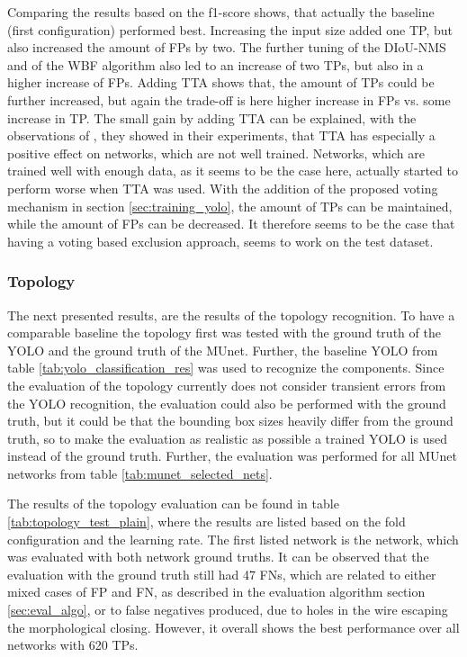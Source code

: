 Comparing the results based on the f1-score shows, that actually the baseline (first configuration) performed best.
Increasing the input size added one \ac{TP}, but also increased the amount of \acp{FP} by two.
The further tuning of the \ac{DIoU}-\ac{NMS} and of the \ac{WBF} algorithm also led to an increase of two \acp{TP}, but also in a higher increase of \acp{FP}.
Adding \ac{TTA} shows that, the amount of \acp{TP} could be further increased, but again the trade-off is here higher increase in \acp{FP} vs. some increase in \ac{TP}.
The small gain by adding \ac{TTA} can be explained, with the observations of \cite{when_tta_works}, they showed in their experiments, that \ac{TTA} has especially a positive effect on networks, which are not well trained.
Networks, which are trained well with enough data, as it seems to be the case here, actually started to perform worse when \ac{TTA} was used.
With the addition of the proposed voting mechanism in section \ref{sec:training_yolo}, the amount of \acp{TP} can be maintained, while the amount of \acp{FP} can be decreased.
It therefore seems to be the case that having a voting based exclusion approach, seems to work on the test dataset.

\subsubsection{Topology}

The next presented results, are the results of the topology recognition.
To have a comparable baseline the topology first was tested with the ground truth of the \ac{YOLO} and the ground truth of the \ac{MUnet}.
Further, the baseline \ac{YOLO} from table \ref{tab:yolo_classification_res} was used to recognize the components.
Since the evaluation of the topology currently does not consider transient errors from the \ac{YOLO} recognition, the evaluation could also be performed with the ground truth, but it could be that the bounding box sizes heavily differ from the ground truth, so to make the evaluation as realistic as possible a trained \ac{YOLO} is used instead of the ground truth.
Further, the evaluation was performed for all \ac{MUnet} networks from table \ref{tab:munet_selected_nets}.

The results of the topology evaluation can be found in table \ref{tab:topology_test_plain}, where the results are listed based on the fold configuration and the learning rate.
The first listed network is the network, which was evaluated with both network ground truths.
It can be observed that the evaluation with the ground truth still had 47 \acp{FN}, which are related to either mixed cases of \ac{FP} and \ac{FN}, as described in the evaluation algorithm section \ref{sec:eval_algo}, or to false negatives produced, due to holes in the wire escaping the morphological closing.
However, it overall shows the best performance over all networks with 620 \acp{TP}.

